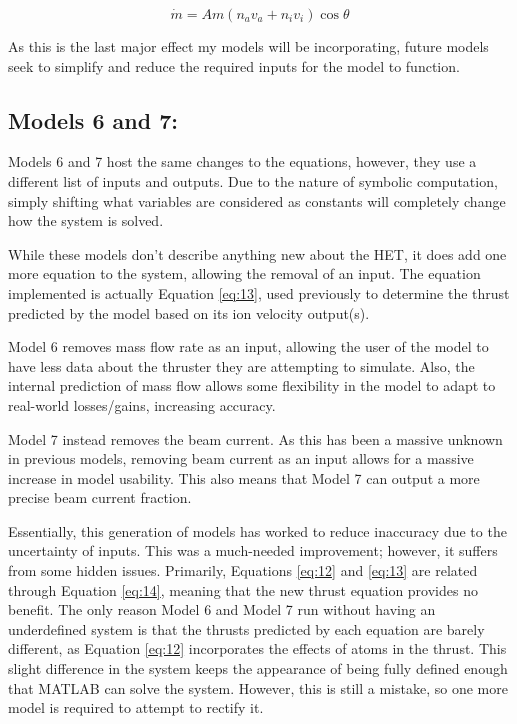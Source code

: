 \documentclass[letterpaper, 10 pt, conference]{ieeeconf}  %
\begin{document}
\begin{equation} \label{eq:14}
\dot{m} = Am(n_av_a + n_iv_i)\cos{\theta}
\end{equation}

As this is the last major effect my models will be incorporating, future models seek to simplify and reduce the required inputs for the model to function. 

\subsection{Models 6 and 7:}
Models 6 and 7 host the same changes to the equations, however, they use a different list of inputs and outputs. Due to the nature of symbolic computation, simply shifting what variables are considered as constants will completely change how the system is solved.

While these models don’t describe anything new about the HET, it does add one more equation to the system, allowing the removal of an input. The equation implemented is actually Equation \ref{eq:13}, used previously to determine the thrust predicted by the model based on its ion velocity output(s).

Model 6 removes mass flow rate as an input, allowing the user of the model to have less data about the thruster they are attempting to simulate. Also, the internal prediction of mass flow allows some flexibility in the model to adapt to real-world losses/gains, increasing accuracy.

Model 7 instead removes the beam current. As this has been a massive unknown in previous models, removing beam current as an input allows for a massive increase in model usability. This also means that Model 7 can output a more precise beam current fraction.

Essentially, this generation of models has worked to reduce inaccuracy due to the uncertainty of inputs. This was a much-needed improvement; however, it suffers from some hidden issues. Primarily, Equations \ref{eq:12} and \ref{eq:13} are related through Equation \ref{eq:14}, meaning that the new thrust equation provides no benefit. The only reason Model 6 and Model 7 run without having an underdefined system is that the thrusts predicted by each equation are barely different, as Equation \ref{eq:12} incorporates the effects of atoms in the thrust. This slight difference in the system keeps the appearance of being fully defined enough that MATLAB can solve the system. However, this is still a mistake, so one more model is required to attempt to rectify it.
\end{document}
